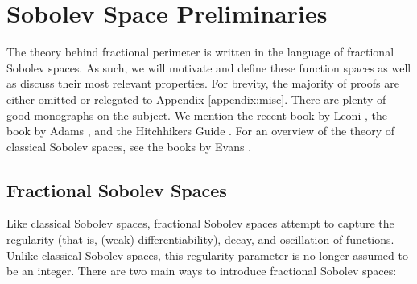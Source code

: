 \documentclass[../main.tex]{subfiles}
\begin{document}
\section{Sobolev Space Preliminaries}


The theory behind fractional perimeter is written in the language of fractional Sobolev spaces. As such, we will motivate and define these function spaces as well as discuss their most relevant properties. For brevity, the majority of proofs are either omitted or relegated to Appendix \ref{appendix:misc}. There are plenty of good monographs on the subject. We mention the recent book by Leoni \cite{leoni:sobolev}, the book by Adams \cite{adams:sobolev}, and the Hitchhikers Guide \cite{hitchhiker}. For an overview of the theory of classical Sobolev spaces, see the books by Evans \cite{evans:pde, evans:gmt}.


\subsection{Fractional Sobolev Spaces}


Like classical Sobolev spaces, fractional Sobolev spaces attempt to capture the regularity (that is, (weak) differentiability), decay, and oscillation of functions. Unlike classical Sobolev spaces, this regularity parameter is no longer assumed to be an integer. There are two main ways to introduce fractional Sobolev spaces:
\end{document}
